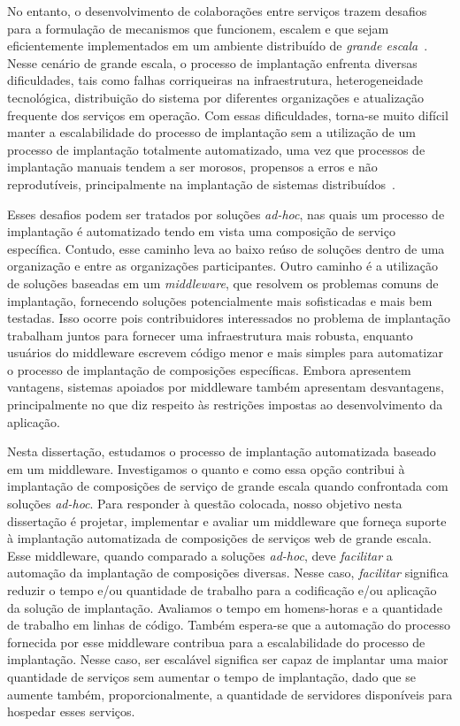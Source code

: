 No entanto, o desenvolvimento de colaborações entre serviços 
trazem desafios para a formulação de mecanismos que funcionem, 
escalem e que sejam eficientemente implementados 
em um ambiente distribuído de \emph{grande escala}~\cite{Steen2011VeryLarge}.
Nesse cenário de grande escala,
o processo de implantação enfrenta diversas dificuldades, 
tais como falhas corriqueiras na infraestrutura, 
heterogeneidade tecnológica, 
distribuição do sistema por diferentes organizações
e atualização frequente dos serviços em operação.
Com essas dificuldades, torna-se muito difícil manter a escalabilidade do processo de implantação
sem a utilização de um processo de implantação totalmente automatizado,
uma vez que processos de implantação manuais tendem a ser
morosos, propensos a erros e não reprodutíveis, principalmente
na implantação de sistemas distribuídos~\cite{Dolstra2005Configuration}.

Esses desafios podem ser tratados por soluções \emph{ad-hoc},
nas quais um processo de implantação é automatizado tendo em vista
uma composição de serviço específica.
Contudo, esse caminho leva ao baixo reúso de soluções
dentro de uma organização e entre as organizações participantes.
Outro caminho é a utilização de soluções baseadas em um \emph{middleware},
que resolvem os problemas comuns de implantação,
fornecendo soluções potencialmente mais sofisticadas e mais bem testadas.
Isso ocorre pois contribuidores interessados no problema de implantação
trabalham juntos para fornecer uma infraestrutura mais robusta,
enquanto usuários do middleware escrevem código menor e mais simples
para automatizar o processo de implantação de composições específicas.
Embora apresentem vantagens, sistemas apoiados por middleware
também apresentam desvantagens, principalmente no que diz respeito
às restrições impostas ao desenvolvimento da aplicação.

Nesta dissertação, estudamos o processo de implantação automatizada baseado em um middleware. 
Investigamos o quanto e como essa opção
contribui à implantação de composições de serviço de grande escala
quando confrontada com soluções \emph{ad-hoc}.
Para responder à questão colocada, nosso objetivo nesta dissertação é 
projetar, implementar e avaliar
um middleware que forneça suporte à implantação automatizada de composições de serviços web
de grande escala.
Esse middleware, quando comparado a soluções \emph{ad-hoc},
deve \emph{facilitar} a automação da implantação de composições diversas.
Nesse caso, \emph{facilitar} significa reduzir o tempo e/ou quantidade de trabalho
para a codificação e/ou aplicação da solução de implantação.
Avaliamos o tempo em homens-horas e a quantidade de trabalho
em linhas de código.
Também espera-se que a automação do processo fornecida por esse middleware
contribua para a escalabilidade do processo de implantação.
Nesse caso, ser escalável significa ser capaz de implantar uma maior quantidade
de serviços sem aumentar o tempo de implantação, dado que se aumente também,
proporcionalmente, a quantidade de servidores disponíveis para hospedar esses serviços.

